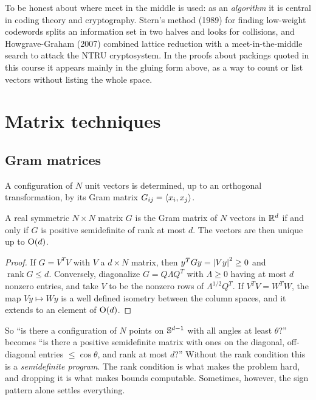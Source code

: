 To be honest about where meet in the middle is used: as an \emph{algorithm} it is central in coding
theory and cryptography. Stern's method (1989) for finding low-weight codewords splits an information set
in two halves and looks for collisions, and Howgrave-Graham (2007) combined lattice reduction with a
meet-in-the-middle search to attack the NTRU cryptosystem. In the proofs about packings quoted in this
course it appears mainly in the gluing form above, as a way to count or list vectors without listing the
whole space.

\section{Matrix techniques}
\label{COMP:sec:matrix}

\subsection{Gram matrices}
A configuration of $N$ unit vectors is determined, up to an orthogonal transformation, by its Gram
matrix $G_{ij}=\langle x_i, x_j\rangle$.

\begin{proposition}\label{COMP:prop:gram}
A real symmetric $N\times N$ matrix $G$ is the Gram matrix of $N$ vectors in $\mathbb{R}^d$ if and only if $G$ is
positive semidefinite of rank at most $d$. The vectors are then unique up to $\mathrm{O}(d)$.
\end{proposition}

\begin{proof}
If $G=V^TV$ with $V$ a $d\times N$ matrix, then $y^TGy=\left\lvert Vy \right\rvert^2\ge0$ and $\operatorname{rank}G\le d$.
Conversely, diagonalize $G=Q\Lambda Q^T$ with $\Lambda\ge0$ having at most $d$ nonzero entries, and take
$V$ to be the nonzero rows of $\Lambda^{1/2}Q^T$. If $V^TV=W^TW$, the map $Vy\mapsto Wy$ is a well defined
isometry between the column spaces, and it extends to an element of $\mathrm{O}(d)$.
\end{proof}

So ``is there a configuration of $N$ points on $\mathbb{S}^{d-1}$ with all angles at least $\theta$?'' becomes ``is
there a positive semidefinite matrix with ones on the diagonal, off-diagonal entries $\le\cos\theta$, and
rank at most $d$?'' Without the rank condition this is a \emph{semidefinite program}. The rank condition
is what makes the problem hard, and dropping it is what makes bounds computable. Sometimes, however, the
sign pattern alone settles everything.

